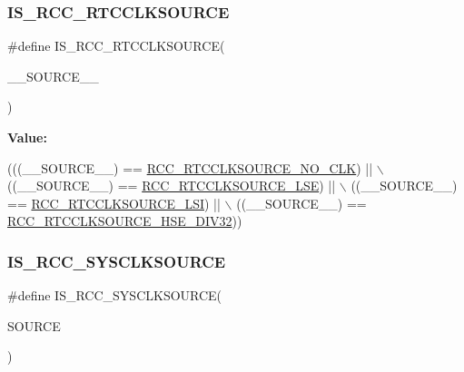 \subsubsection{\texorpdfstring{I\+S\+\_\+\+R\+C\+C\+\_\+\+R\+T\+C\+C\+L\+K\+S\+O\+U\+R\+CE}{IS\_RCC\_RTCCLKSOURCE}}
{\footnotesize\ttfamily \#define I\+S\+\_\+\+R\+C\+C\+\_\+\+R\+T\+C\+C\+L\+K\+S\+O\+U\+R\+CE(\begin{DoxyParamCaption}\item[{}]{\+\_\+\+\_\+\+S\+O\+U\+R\+C\+E\+\_\+\+\_\+ }\end{DoxyParamCaption})}

{\bfseries Value\+:}
\begin{DoxyCode}
(((\_\_SOURCE\_\_) == \hyperlink{group___r_c_c___r_t_c___clock___source_gacce0b2f54d103340d8c3a218e86e295d}{RCC\_RTCCLKSOURCE\_NO\_CLK}) || \(\backslash\)
                                          ((\_\_SOURCE\_\_) == \hyperlink{group___r_c_c___r_t_c___clock___source_ga5dca8d63f250a20bd6bc005670d0c150}{RCC\_RTCCLKSOURCE\_LSE})  || \(\backslash\)
                                          ((\_\_SOURCE\_\_) == \hyperlink{group___r_c_c___r_t_c___clock___source_gab47a1afb8b5eef9f20f4772961d0a5f4}{RCC\_RTCCLKSOURCE\_LSI})  || \(\backslash\)
                                          ((\_\_SOURCE\_\_) == 
      \hyperlink{group___r_c_c___r_t_c___clock___source_ga070b819c6eca00d4b89cbf35216c3a92}{RCC\_RTCCLKSOURCE\_HSE\_DIV32}))
\end{DoxyCode}
\mbox{\label{group___r_c_c___private___macros_ga0797bfc445903525324cbd06a6cebbd2}} 
\subsubsection{\texorpdfstring{I\+S\+\_\+\+R\+C\+C\+\_\+\+S\+Y\+S\+C\+L\+K\+S\+O\+U\+R\+CE}{IS\_RCC\_SYSCLKSOURCE}}
{\footnotesize\ttfamily \#define I\+S\+\_\+\+R\+C\+C\+\_\+\+S\+Y\+S\+C\+L\+K\+S\+O\+U\+R\+CE(\begin{DoxyParamCaption}\item[{}]{S\+O\+U\+R\+CE }\end{DoxyParamCaption})}


